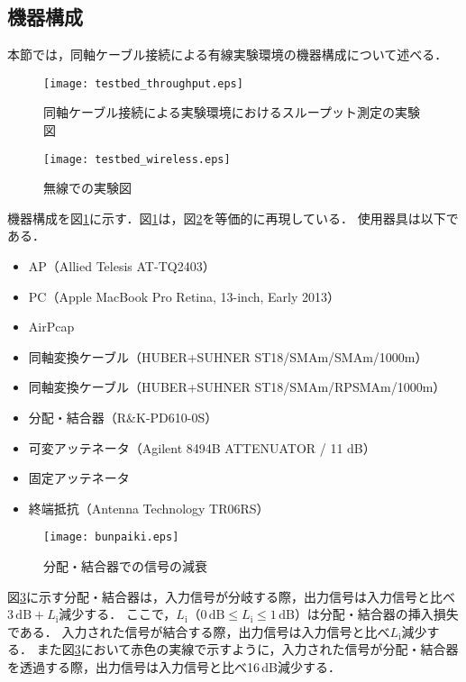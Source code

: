 \documentclass[master]{kuisthesis}		%
\begin{document}
\subsection{機器構成}
本節では，同軸ケーブル接続による有線実験環境の機器構成について述べる．
\ifnum {}
\begin{figure}[!t]
\centering
\texttt{[image: testbed\_throughput.eps]}
\caption{同軸ケーブル接続による実験環境におけるスループット測定の実験図}
\label{t_mesure}
\end{figure}
\fi
\ifnum {}
\begin{figure}[!t]
\centering
\texttt{[image: testbed\_wireless.eps]}
\caption{無線での実験図}
\label{w_mesure}
\end{figure}
\fi
機器構成を図\ref{t_mesure}に示す．図\ref{t_mesure}は，図\ref{w_mesure}を等価的に再現している．
使用器具は以下である．
\begin{itemize}
\item AP（Allied Telesis AT-TQ2403）
\item PC（Apple MacBook Pro Retina, 13-inch, Early 2013）
\item AirPcap
\item 同軸変換ケーブル（HUBER+SUHNER ST18/SMAm/SMAm/1000m）
\item 同軸変換ケーブル（HUBER+SUHNER ST18/SMAm/RPSMAm/1000m）
\item 分配・結合器（R\&K-PD610-0S）
\item 可変アッテネータ（Agilent 8494B ATTENUATOR / 11 dB）
\item 固定アッテネータ
\item 終端抵抗（Antenna Technology TR06RS）
\end{itemize}
\ifnum {}
\begin{figure}[!t]
\centering
\texttt{[image: bunpaiki.eps]}
\caption{分配・結合器での信号の減衰}
\label{bunpaiki}
\end{figure}
\fi
図\ref{bunpaiki}に示す分配・結合器は，入力信号が分岐する際，出力信号は入力信号と比べ$3\,\mathrm{dB} + L_\mathrm{i}$減少する．
ここで，$L_{\mathrm{i}}$（$0\,\mathrm{dB} \leq L_{\mathrm{i}} \leq 1\,\mathrm{dB}$）は分配・結合器の挿入損失である．
入力された信号が結合する際，出力信号は入力信号と比べ$L_\mathrm{i}$減少する．
また図\ref{bunpaiki}において赤色の実線で示すように，入力された信号が分配・結合器を透過する際，出力信号は入力信号と比べ16\,dB減少する．
\end{document}

